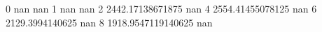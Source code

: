 0 nan nan
1 nan nan
2 2442.17138671875 nan
4 2554.41455078125 nan
6 2129.3994140625 nan
8 1918.9547119140625 nan
